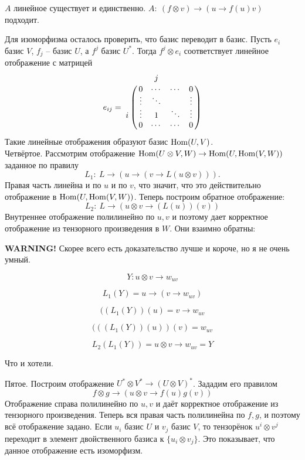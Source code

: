 \begin{center}
\end{center}

		$A$ линейное существует и единственно. $A:\ (f\otimes v)\to (u\to f(u)v)$ подходит.

		Для изоморфизма осталось проверить, что базис переводит в базис. Пусть $e_i$ базис $V$, $f_j$ -- базис $U$, а $f^j$ базис $U^{*}$. Тогда $f^j\otimes e_i$ соответствует линейное отображение с матрицей 
$$ e_{ij}= \bordermatrix{
 & &j&& \cr
 &0&\cdots&\cdots&0\cr
 &\vdots&\ddots && \vdots\cr
i&\vdots& 1 & \ddots& \vdots\cr
 &0&\cdots& \cdots&0
}$$
		Такие линейные отображения образуют базис $\operatorname{Hom}(U,V)$.\\

		Четвёртое. Рассмотрим отображение $ \operatorname{Hom} (U\otimes V,  W) \to \operatorname{Hom} (U, \operatorname{Hom} (V,W))$ заданное по правилу 
		$$L_1:\ L \to (u \to (v \to L(u\otimes v))).$$
		Правая часть линейна и по $u$ и по $v$, что значит, что это действительно отображение в $\operatorname{Hom} (U, \operatorname{Hom} (V,W))$.
		Теперь построим обратное отображение: 
		$$L_2:\ L \to (u\otimes v \to (L(u))(v))$$
		Внутреннее отображение полилинейно по $u,v$ и поэтому дает корректное отображение из тензорного произведения в $W$. Они взаимно обратны:

		{\bf WARNING!} Скорее всего есть доказательство лучше и короче, но я не очень умный.

		$$Y: u\otimes v \to w_{uv}$$

		$$L_1(Y)=u\to (v\to w_{uv})$$

		$$((L_1(Y))(u) = v\to w_{uv}$$

		$$(((L_1(Y))(u))(v) = w_{uv}$$

		$$L_2(L_1(Y)) = u\otimes v \to w_{uv} = Y$$

		Что и хотели.

		Пятое. Построим отображение $U^{*}\otimes V^{*} \to (U \otimes V)^{*}$. Зададим его правилом
		$$f\otimes g \to (u\otimes v \to f(u)g(v))$$
		Отображение справа полилинейно по $u,v$ и даёт корректное отображение из тензорного произведения. Теперь вся правая часть полилинейна по $f,g$, и поэтому всё отображение задано. Если $u_i$ базис $U$ и $v_j$ базис $V$, то тензорёнок $u^i\otimes v^j$  переходит в элемент двойственного базиса к $\{u_i\otimes v_j\}$. Это показывает, что данное отображение есть изоморфизм. 

	\endproof 
\ethrm